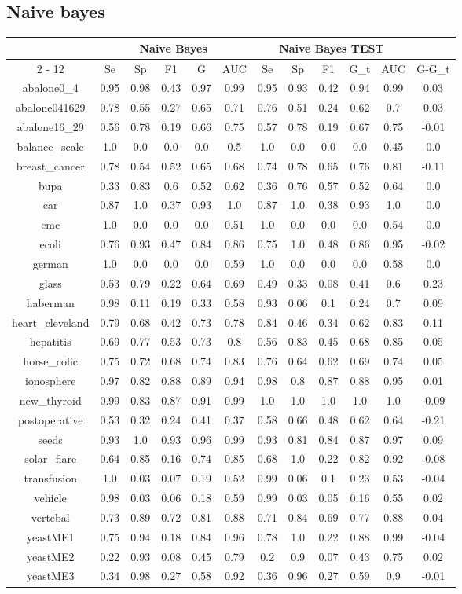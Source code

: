 \documentclass{article}%
\begin{document}
\subsection*{Naive bayes}%
\begin{tabular}{|c|c|c|c|c|c|c|c|c|c|c|c|}%
\hline%
&\multicolumn{5}{|c|}{Naive Bayes}&\multicolumn{5}{|c|}{Naive Bayes TEST}&\\%
\cline{2%
-%
12}%
&Se&Sp&F1&G&AUC&Se&Sp&F1&G\_t&AUC&G{-}G\_t\\%
\hline%
abalone0\_4&0.95&0.98&0.43&0.97&0.99&0.95&0.93&0.42&0.94&0.99&0.03\\%
abalone041629&0.78&0.55&0.27&0.65&0.71&0.76&0.51&0.24&0.62&0.7&0.03\\%
abalone16\_29&0.56&0.78&0.19&0.66&0.75&0.57&0.78&0.19&0.67&0.75&{-}0.01\\%
balance\_scale&1.0&0.0&0.0&0.0&0.5&1.0&0.0&0.0&0.0&0.45&0.0\\%
breast\_cancer&0.78&0.54&0.52&0.65&0.68&0.74&0.78&0.65&0.76&0.81&{-}0.11\\%
bupa&0.33&0.83&0.6&0.52&0.62&0.36&0.76&0.57&0.52&0.64&0.0\\%
car&0.87&1.0&0.37&0.93&1.0&0.87&1.0&0.38&0.93&1.0&0.0\\%
cmc&1.0&0.0&0.0&0.0&0.51&1.0&0.0&0.0&0.0&0.54&0.0\\%
ecoli&0.76&0.93&0.47&0.84&0.86&0.75&1.0&0.48&0.86&0.95&{-}0.02\\%
german&1.0&0.0&0.0&0.0&0.59&1.0&0.0&0.0&0.0&0.58&0.0\\%
glass&0.53&0.79&0.22&0.64&0.69&0.49&0.33&0.08&0.41&0.6&0.23\\%
haberman&0.98&0.11&0.19&0.33&0.58&0.93&0.06&0.1&0.24&0.7&0.09\\%
heart\_cleveland&0.79&0.68&0.42&0.73&0.78&0.84&0.46&0.34&0.62&0.83&0.11\\%
hepatitis&0.69&0.77&0.53&0.73&0.8&0.56&0.83&0.45&0.68&0.85&0.05\\%
horse\_colic&0.75&0.72&0.68&0.74&0.83&0.76&0.64&0.62&0.69&0.74&0.05\\%
ionosphere&0.97&0.82&0.88&0.89&0.94&0.98&0.8&0.87&0.88&0.95&0.01\\%
new\_thyroid&0.99&0.83&0.87&0.91&0.99&1.0&1.0&1.0&1.0&1.0&{-}0.09\\%
postoperative&0.53&0.32&0.24&0.41&0.37&0.58&0.66&0.48&0.62&0.64&{-}0.21\\%
seeds&0.93&1.0&0.93&0.96&0.99&0.93&0.81&0.84&0.87&0.97&0.09\\%
solar\_flare&0.64&0.85&0.16&0.74&0.85&0.68&1.0&0.22&0.82&0.92&{-}0.08\\%
transfusion&1.0&0.03&0.07&0.19&0.52&0.99&0.06&0.1&0.23&0.53&{-}0.04\\%
vehicle&0.98&0.03&0.06&0.18&0.59&0.99&0.03&0.05&0.16&0.55&0.02\\%
vertebal&0.73&0.89&0.72&0.81&0.88&0.71&0.84&0.69&0.77&0.88&0.04\\%
yeastME1&0.75&0.94&0.18&0.84&0.96&0.78&1.0&0.22&0.88&0.99&{-}0.04\\%
yeastME2&0.22&0.93&0.08&0.45&0.79&0.2&0.9&0.07&0.43&0.75&0.02\\%
yeastME3&0.34&0.98&0.27&0.58&0.92&0.36&0.96&0.27&0.59&0.9&{-}0.01\\%
\hline%
\end{tabular}
\end{document}
